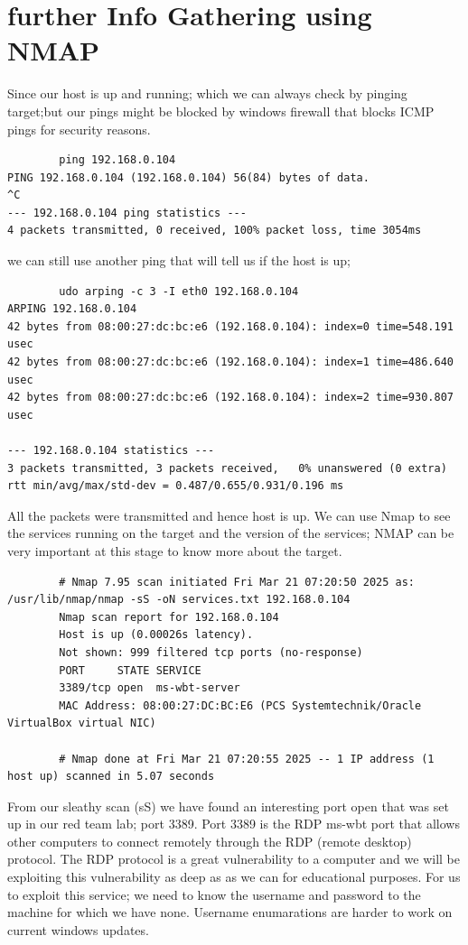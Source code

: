 \documentclass[a4paper,12pt]{article}
\begin{document}
\newpage{}
\section{further Info Gathering using NMAP}
Since our host is up and running; which we can always check by pinging target;but our pings might be blocked by windows firewall
that blocks ICMP pings for security reasons.
\begin{verbatim}
        ping 192.168.0.104
PING 192.168.0.104 (192.168.0.104) 56(84) bytes of data.
^C
--- 192.168.0.104 ping statistics ---
4 packets transmitted, 0 received, 100% packet loss, time 3054ms
\end{verbatim}
we can still use another ping that will tell us if the host is up;
\begin{verbatim}
        udo arping -c 3 -I eth0 192.168.0.104
ARPING 192.168.0.104
42 bytes from 08:00:27:dc:bc:e6 (192.168.0.104): index=0 time=548.191 usec
42 bytes from 08:00:27:dc:bc:e6 (192.168.0.104): index=1 time=486.640 usec
42 bytes from 08:00:27:dc:bc:e6 (192.168.0.104): index=2 time=930.807 usec

--- 192.168.0.104 statistics ---
3 packets transmitted, 3 packets received,   0% unanswered (0 extra)
rtt min/avg/max/std-dev = 0.487/0.655/0.931/0.196 ms

\end{verbatim}
All the packets were transmitted and hence host is up.
We can use Nmap to see the services running on the target and the version of the services; NMAP can be very important at this stage 
to know more about the target.
\begin{verbatim}
        # Nmap 7.95 scan initiated Fri Mar 21 07:20:50 2025 as: /usr/lib/nmap/nmap -sS -oN services.txt 192.168.0.104
        Nmap scan report for 192.168.0.104
        Host is up (0.00026s latency).
        Not shown: 999 filtered tcp ports (no-response)
        PORT     STATE SERVICE
        3389/tcp open  ms-wbt-server
        MAC Address: 08:00:27:DC:BC:E6 (PCS Systemtechnik/Oracle VirtualBox virtual NIC)
        
        # Nmap done at Fri Mar 21 07:20:55 2025 -- 1 IP address (1 host up) scanned in 5.07 seconds      
\end{verbatim}
From our sleathy scan (sS) we have found an interesting port open that was set up in our red team lab; port 3389.
Port 3389 is the RDP ms-wbt port that allows other computers to connect remotely through the RDP (remote desktop) protocol.
The RDP protocol is a great vulnerability to a computer and we will be exploiting this vulnerability as deep as as we can for
educational purposes.
For us to exploit this service; we need to know the username and password to the machine for which we have none.
Username enumarations are harder to work on current windows updates.
\end{document}
